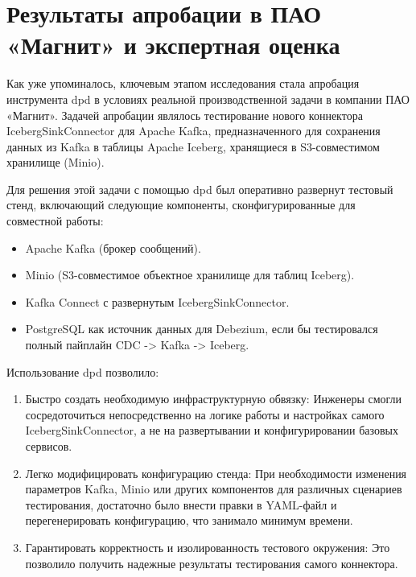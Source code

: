 \section{Результаты апробации в ПАО «Магнит» и экспертная оценка}

Как уже упоминалось, ключевым этапом исследования стала апробация инструмента dpd в условиях реальной производственной задачи в компании ПАО «Магнит». Задачей апробации являлось тестирование нового коннектора IcebergSinkConnector для Apache Kafka, предназначенного для сохранения данных из Kafka в таблицы Apache Iceberg, хранящиеся в S3-совместимом хранилище (Minio).

Для решения этой задачи с помощью dpd был оперативно развернут тестовый стенд, включающий следующие компоненты, сконфигурированные для совместной работы:
\begin{itemize}  
\item Apache Kafka (брокер сообщений).
\item  Minio (S3-совместимое объектное хранилище для таблиц Iceberg).
\item  Kafka Connect с развернутым IcebergSinkConnector.
\item  PostgreSQL как источник данных для Debezium, если бы тестировался полный пайплайн CDC -> Kafka -> Iceberg.
\end{itemize}

Использование dpd позволило:
\begin{enumerate}[1.]
\item Быстро создать необходимую инфраструктурную обвязку: Инженеры смогли сосредоточиться непосредственно на логике работы и настройках самого IcebergSinkConnector, а не на развертывании и конфигурировании базовых сервисов.
\item Легко модифицировать конфигурацию стенда: При необходимости изменения параметров Kafka, Minio или других компонентов для различных сценариев тестирования, достаточно было внести правки в YAML-файл и перегенерировать конфигурацию, что занимало минимум времени.
\item Гарантировать корректность и изолированность тестового окружения: Это позволило получить надежные результаты тестирования самого коннектора.
\end{enumerate}

